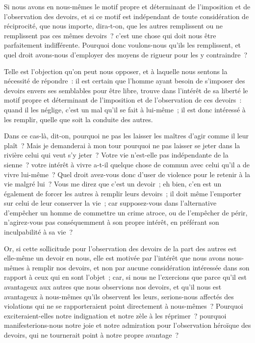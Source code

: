 \documentclass[french,twoside]{book} %
\newcommand\chaptercont{} %
\begin{document}
\chaptercont
\noindent Si nous avons en nous-mêmes le motif propre et déterminant de l’imposition et de l’observation des devoirs, et si ce motif est indépendant de toute considération de réciprocité, que nous importe, dira-t-on, que les autres remplissent ou ne remplissent pas ces mêmes devoirs ? c’est une chose qui doit nous être parfaitement indifférente. Pourquoi donc voulons-nous qu’ils les remplissent, et quel droit avons-nous d’employer des moyens de rigueur pour les y contraindre ?\par
Telle est l’objection qu’on peut nous opposer, et à laquelle nous sentons la nécessité de répondre : il est certain que l’homme ayant besoin de s’imposer des devoirs envers ses semblables pour être libre, trouve dans l’intérêt de sa liberté le motif propre et déterminant de l’imposition et de l’observation de ces devoirs : quand il les néglige, c’est un mal qu’il se fait à lui-même ; il est donc intéressé à les remplir, quelle que soit la conduite des autres.\par
Dans ce cas-là, dit-on, pourquoi ne pas les laisser les maîtres d’agir comme il leur plaît ? Mais je demanderai à mon tour pourquoi ne pas laisser se jeter dans la rivière celui qui veut s’y jeter ? Votre vie n’est-elle pas indépendante de la sienne ? votre intérêt à vivre a-t-il quelque chose de commun avec celui qu’il a de vivre lui-même ? Quel droit avez-vous donc d’user de violence pour le retenir à la vie malgré lui ? Vous me direz que c’est un devoir ; eh bien, c’en est un également de forcer les autres à remplir leurs devoirs ; il doit même l’emporter sur celui de leur conserver la vie ; car supposez-vous dans l’alternative d’empêcher un homme de commettre un crime atroce, ou de l’empêcher de périr, n’agirez-vous pas conséquemment à son propre intérêt, en préférant son inculpabilité à sa vie ?\par
Or, si cette sollicitude pour l’observation des devoirs de la part des autres est elle-même un devoir en nous, elle est motivée par l’intérêt que nous avons nous-mêmes à remplir nos devoirs, et non par aucune considération intéressée dans son rapport à ceux qui en sont l’objet ; car, si nous ne l’exercions que parce qu’il est avantageux aux autres que nous observions nos devoirs, et qu’il nous est avantageux à nous-mêmes qu’ils observent les leurs, serions-nous affectés des violations qui ne se rapporteraient point directement à nous-mêmes ? Pourquoi exciteraient-elles notre indignation et notre zèle à les réprimer ? pourquoi manifesterions-nous notre joie et notre admiration pour l’observation héroïque des devoirs, qui ne tournerait point à notre propre avantage ?\par
\end{document}
